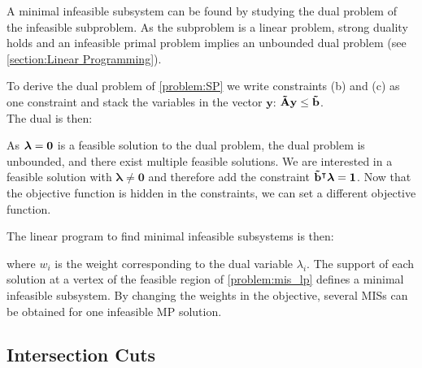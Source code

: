 A minimal infeasible subsystem can be found by studying the dual problem of the infeasible subproblem. As the subproblem is a linear problem, strong duality holds and an infeasible primal problem implies an unbounded dual problem (see \cref{section:Linear Programming}).

To derive the dual problem of \cref{problem:SP} we write constraints (b) and (c) as one constraint and stack the variables in the vector $\mathbf y$: $\bold{\tilde A} \mathbf y \leq \bold{\tilde b}$. \\
The dual is then:

As $\boldsymbol \lambda = \bold 0$ is a feasible solution to the dual problem, the dual problem is unbounded, and there exist multiple feasible solutions. We are interested in a feasible solution with $\boldsymbol \lambda \neq \mathbf 0$ and therefore add the constraint $\bold{\tilde b}^\intercal \boldsymbol \lambda = \mathbf 1$. Now that the objective function is hidden in the constraints, we can set a different objective function. 

The linear program to find minimal infeasible subsystems is then:
 where $w_i$ is the weight corresponding to the dual variable $\lambda_i$. The support of each solution at a vertex of the feasible region of \cref{problem:mis_lp}  defines a minimal infeasible subsystem. By changing the weights in the objective, several MISs can be obtained for one infeasible MP solution. 


\subsection{Intersection Cuts} \label{section:optimization_intersection_cuts}

